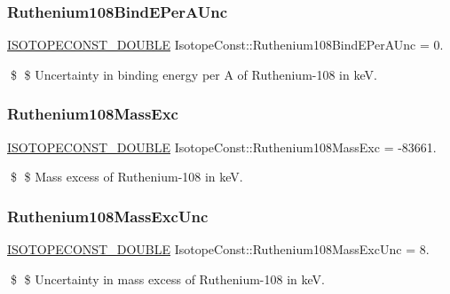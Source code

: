 \subsubsection{\texorpdfstring{Ruthenium108\+Bind\+E\+Per\+A\+Unc}{Ruthenium108BindEPerAUnc}}
{\footnotesize\ttfamily \mbox{\hyperlink{group___isotope_const-_macros_ga8f45a7272ce02c0b4c65c44636ed719a}{I\+S\+O\+T\+O\+P\+E\+C\+O\+N\+S\+T\+\_\+\+D\+O\+U\+B\+LE}} Isotope\+Const\+::\+Ruthenium108\+Bind\+E\+Per\+A\+Unc = 0.}

\$ \$ Uncertainty in binding energy per A of Ruthenium-\/108 in keV. \mbox{\label{group___isotope_const-_ruthenium-_ru108_gadfa339ccf0095a00173e1396d4bf0926}} 
\subsubsection{\texorpdfstring{Ruthenium108\+Mass\+Exc}{Ruthenium108MassExc}}
{\footnotesize\ttfamily \mbox{\hyperlink{group___isotope_const-_macros_ga8f45a7272ce02c0b4c65c44636ed719a}{I\+S\+O\+T\+O\+P\+E\+C\+O\+N\+S\+T\+\_\+\+D\+O\+U\+B\+LE}} Isotope\+Const\+::\+Ruthenium108\+Mass\+Exc = -\/83661.}

\$ \$ Mass excess of Ruthenium-\/108 in keV. \mbox{\label{group___isotope_const-_ruthenium-_ru108_ga92400819d0c290e66364f5675ac09369}} 
\subsubsection{\texorpdfstring{Ruthenium108\+Mass\+Exc\+Unc}{Ruthenium108MassExcUnc}}
{\footnotesize\ttfamily \mbox{\hyperlink{group___isotope_const-_macros_ga8f45a7272ce02c0b4c65c44636ed719a}{I\+S\+O\+T\+O\+P\+E\+C\+O\+N\+S\+T\+\_\+\+D\+O\+U\+B\+LE}} Isotope\+Const\+::\+Ruthenium108\+Mass\+Exc\+Unc = 8.}

\$ \$ Uncertainty in mass excess of Ruthenium-\/108 in keV. \mbox{\label{group___isotope_const-_ruthenium-_ru108_gafbe75c6455600caf3eea90d013d0e02e}} 
